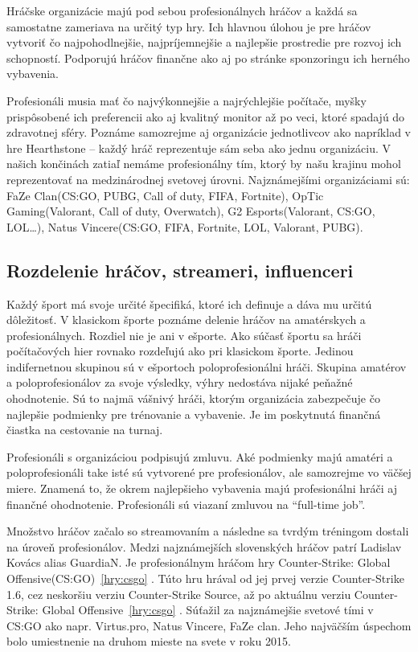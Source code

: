 \documentclass[10pt,oneside,slovak,a4paper]{article}
\begin{document}
Hráčske organizácie majú pod sebou profesionálnych hráčov a každá sa samostatne zameriava na určitý typ hry. Ich hlavnou úlohou je pre hráčov vytvoriť čo najpohodlnejšie, najpríjemnejšie a najlepšie prostredie pre rozvoj ich schopností. Podporujú hráčov finančne ako aj po stránke sponzoringu ich herného vybavenia. 

Profesionáli musia mať čo najvýkonnejšie a najrýchlejšie počítače, myšky prispôsobené ich preferencii ako aj kvalitný monitor až po veci, ktoré spadajú do zdravotnej sféry. Poznáme samozrejme aj organizácie jednotlivcov ako napríklad v hre Hearthstone – každý hráč reprezentuje sám seba ako jednu organizáciu. V našich končinách zatiaľ nemáme profesionálny tím, ktorý by našu krajinu mohol reprezentovať na medzinárodnej svetovej úrovni.\cite{a4} Najznámejšími organizáciami sú: FaZe Clan(CS:GO, PUBG, Call of duty, FIFA, Fortnite), OpTic Gaming(Valorant, Call of duty, Overwatch), G2 Esports(Valorant, CS:GO, LOL…), Natus Vincere(CS:GO, FIFA, Fortnite, LOL, Valorant, PUBG).\cite{a5}


\subsection{Rozdelenie hráčov, streameri, influenceri} \label{klasifikacia:rozdelenie}

Každý šport má svoje určité špecifiká, ktoré ich definuje a dáva mu určitú dôležitosť. V klasickom športe poznáme delenie hráčov na amatérskych a profesionálnych. Rozdiel nie je ani v ešporte. Ako súčasť športu sa hráči počítačových hier rovnako rozdeľujú ako pri klasickom športe. Jedinou indifernetnou skupinou sú v ešportoch poloprofesionálni hráči. 
Skupina amatérov a poloprofesionálov za svoje výsledky, výhry nedostáva nijaké peňažné ohodnotenie. Sú to najmä vášnivý hráči, ktorým organizácia zabezpečuje čo najlepšie podmienky pre trénovanie a vybavenie. Je im poskytnutá finančná čiastka na cestovanie na turnaj. 

Profesionáli s organizáciou podpisujú zmluvu. Aké podmienky majú amatéri a poloprofesionáli take isté sú vytvorené pre profesionálov, ale samozrejme vo väčšej miere. Znamená to, že okrem najlepšieho vybavenia majú profesionálni hráči aj finančné ohodnotenie. Profesionáli sú viazaní zmluvou na “full-time job”.\cite{a1}

Množstvo hráčov začalo so streamovaním a následne sa tvrdým tréningom dostali na úroveň profesionálov. Medzi najznámejších slovenských hráčov patrí Ladislav Kovács alias GuardiaN. Je profesionálnym hráčom hry Counter-Strike: Global Offensive(CS:GO)~\ref{hry:csgo} . Túto hru hrával od jej prvej verzie Counter-Strike 1.6, cez neskoršiu verziu Counter-Strike Source, až po aktuálnu verziu Counter-Strike: Global Offensive~\ref{hry:csgo} . Súťažil za najznámejšie svetové tími v CS:GO ako napr. Virtus.pro, Natus Vincere, FaZe clan. Jeho najväčším úspechom bolo umiestnenie na druhom mieste na svete v roku 2015.
\end{document}
